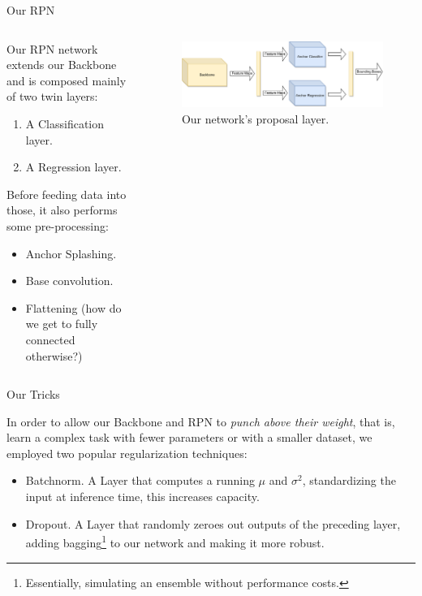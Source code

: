\documentclass[english]{beamer}
\begin{document}
\begin{frame}{Our RPN}
  \begin{columns}
    
    \begin{column}{0.5\textwidth}
      Our RPN network extends our Backbone and is composed mainly of two twin layers:
      \begin{enumerate}
        \item A Classification layer.
        \item A Regression layer.
      \end{enumerate}
      Before feeding data into those, it also performs some pre-processing:
      \begin{itemize}
        \item Anchor Splashing.
        \item Base convolution.
        \item Flattening (how do we get to fully connected otherwise?)
      \end{itemize}
    \end{column}

    \begin{column}{0.5\textwidth}
      \begin{figure}
        \centering
            \includegraphics[width=1.0\textwidth]{images/network.pdf}
            \caption{Our network's proposal layer.}
        \end{figure}
    \end{column}

  \end{columns}
\end{frame}

\begin{frame}{Our Tricks}

  In order to allow our Backbone and RPN to \emph{punch above their weight}, that is, learn a complex task
  with fewer parameters or with a smaller dataset, we employed two popular regularization techniques:

  \begin{itemize}
    \item Batchnorm.
    A Layer that computes a running $\mu$ and $\sigma^2$, standardizing the input at inference time, this 
    increases capacity.
    \item Dropout.
    A Layer that randomly zeroes out outputs of the preceding layer, adding bagging\footnote{Essentially, simulating an ensemble without performance costs.}
    to our network and making it more robust.
  \end{itemize}

\end{frame}
\end{document}

